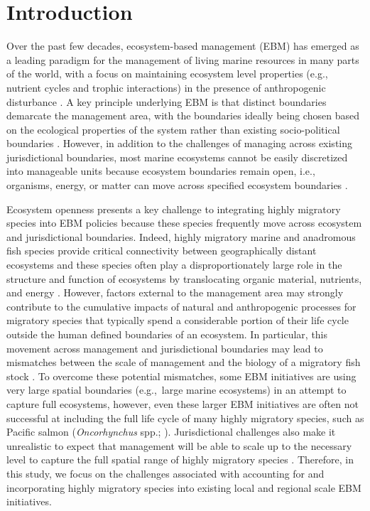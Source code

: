 \section{Introduction}

Over the past few decades, ecosystem-based management (EBM) has emerged as a
leading paradigm for the management of living marine resources in many parts of
the world, with a focus on maintaining ecosystem level properties (e.g.,
nutrient cycles and trophic interactions) in the presence of anthropogenic
disturbance \citep{Engler2015, Skjoldal2008, Fletcher2008, Constable2011,
Olsson2008}. A key principle underlying EBM is that distinct boundaries
demarcate the management area, with the boundaries ideally being chosen based on
the ecological properties of the system rather than existing socio-political
boundaries \citep{Long2015, Engler2015}. However, in addition to the challenges
of managing across existing jurisdictional boundaries, most marine ecosystems
cannot be easily discretized into manageable units because ecosystem boundaries
remain open, i.e., organisms, energy, or matter can move across specified
ecosystem boundaries \citep{ONeill2001}.

Ecosystem openness presents a key challenge to integrating highly migratory
species into EBM policies because these species frequently move across ecosystem
and jurisdictional boundaries. Indeed, highly migratory marine and anadromous
fish species provide critical connectivity between geographically distant
ecosystems and these species often play a disproportionately large role in the
structure and function of ecosystems by translocating organic material,
nutrients, and energy \citep{Lundberg2003, Heupel2015}. However, factors
external to the management area may strongly contribute to the cumulative
impacts of natural and anthropogenic processes for migratory species that
typically spend a considerable portion of their life cycle outside the human
defined boundaries of an ecosystem. In particular, this movement across
management and jurisdictional boundaries may lead to mismatches between the
scale of management and the biology of a migratory fish stock \citep{Cash2006a,
Epstein2015}. To overcome these potential mismatches, some EBM initiatives are
using very large spatial boundaries (e.g.,~large marine ecosystems) in an
attempt to capture full ecosystems, however, even these larger EBM initiatives
are often not successful at including the full life cycle of many highly
migratory species, such as Pacific salmon (\emph{Oncorhynchus} spp.;
\citealp{Field2006a, Sherman1999, Wang2004}). Jurisdictional challenges also
make it unrealistic to expect that management will be able to scale up to the
necessary level to capture the full spatial range of highly migratory species
\citep{Cowan2012, Lascelles2014}. Therefore, in this study, we focus on the
challenges associated with accounting for and incorporating highly migratory
species into existing local and regional scale EBM initiatives.

